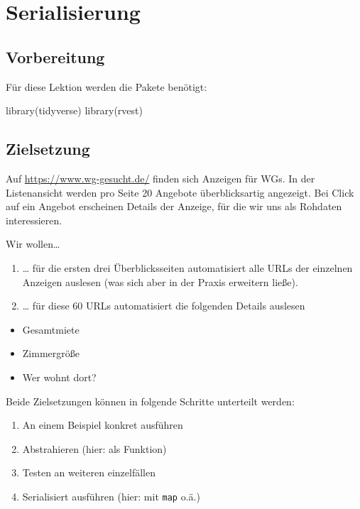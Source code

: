 \documentclass[
  ngerman,
]{article}
\newenvironment{Shaded}{\begin{snugshade}}{\end{snugshade}}
\newcommand{\FunctionTok}[1]{\textcolor[rgb]{0.00,0.00,0.00}{#1}}
\newcommand{\NormalTok}[1]{#1}
\providecommand{\tightlist}{%
  \setlength{\itemsep}{0pt}\setlength{\parskip}{0pt}}
\begin{document}
\hypertarget{serialisierung}{%
\section{Serialisierung}\label{serialisierung}}

\hypertarget{vorbereitung-5}{%
\subsection{Vorbereitung}\label{vorbereitung-5}}

Für diese Lektion werden die Pakete benötigt:

\begin{Shaded}
\begin{Highlighting}[]
\FunctionTok{library}\NormalTok{(tidyverse)}
\FunctionTok{library}\NormalTok{(rvest)}
\end{Highlighting}
\end{Shaded}

\hypertarget{zielsetzung}{%
\subsection{Zielsetzung}\label{zielsetzung}}

Auf \url{https://www.wg-gesucht.de/} finden sich Anzeigen für WGs. In der Listenansicht werden pro Seite 20 Angebote überblicksartig angezeigt. Bei Click auf ein Angebot erscheinen Details der Anzeige, für die wir uns als Rohdaten interessieren.

Wir wollen\ldots{}

\begin{enumerate}
\def\labelenumi{\arabic{enumi}.}
\tightlist
\item
  \ldots{} für die ersten drei Überblicksseiten automatisiert alle URLs der einzelnen Anzeigen auslesen (was sich aber in der Praxis erweitern ließe).
\item
  \ldots{} für diese 60 URLs automatisiert die folgenden Details auslesen
\end{enumerate}

\begin{itemize}
\tightlist
\item
  Gesamtmiete
\item
  Zimmergröße
\item
  Wer wohnt dort?
\end{itemize}

Beide Zielsetzungen können in folgende Schritte unterteilt werden:

\begin{enumerate}
\def\labelenumi{\arabic{enumi}.}
\tightlist
\item
  An einem Beispiel konkret ausführen
\item
  Abstrahieren (hier: als Funktion)
\item
  Testen an weiteren einzelfällen
\item
  Serialisiert ausführen (hier: mit \texttt{map} o.ä.)
\end{enumerate}
\end{document}
